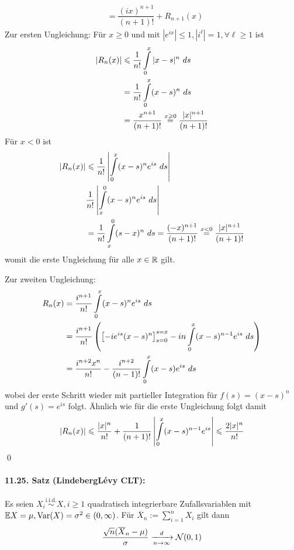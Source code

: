 \begin{enumerate}
\begin{align*}
         &=\dfrac{(ix)^{n+1}}{(n+1)!}+R_{n+1}(x)
     \end{align*}
     Zur ersten Ungleichung: \newline
     F\"ur $x\geq0$ und mit $|e^{ix}|\leq1, |i^\ell|=1,\forall\ell\geq1$ ist
     \begin{align*}
         |R_n(x)|&\leq\dfrac{1}{n!}\int\displaylimits_0^x|x-s|^n\ ds\\
         &=\dfrac{1}{n!}\int\displaylimits_0^x(x-s)^n\ ds \\
         &=\dfrac{x^{n+1}}{(n+1)!}\overset{x\geq0}{=}\dfrac{|x|^{n+1}}{(n+1)!}
     \end{align*}
     F\"ur $x<0$ ist
     \begin{align*}
         |R_n(x)|&\leq\dfrac{1}{n!}\left|\int\displaylimits_0^x(x-s)^ne^{is}\ ds\right|\\
         &\dfrac{1}{n!}\left|\int\displaylimits_x^0(x-s)^ne^{is}\ ds\right| \\
         &=\dfrac{1}{n!}\int\displaylimits_x^0(s-x)^n\ ds =\dfrac{(-x)^{n+1}}{(n+1)!}\overset{x<0}{=}\dfrac{|x|^{n+1}}{(n+1)!}
     \end{align*}
     womit die erste Ungleichung f\"ur alle $x\in\R$ gilt.
 \end{enumerate}
 Zur zweiten Ungleichung:\newline
 \begin{align*}
     R_n(x)&=\dfrac{i^{n+1}}{n!}\int\displaylimits_0^x(x-s)^ne^{is}\ ds\\
     &=\dfrac{i^{n+1}}{n!}\left(\left[-ie^{is}(x-s)^n\right]_{s=0}^{s=x}-in\int\displaylimits_0^x(x-s)^{n-1}e^{is}\ ds\right) \\
     &=\dfrac{i^{n+2}x^n}{n!}-\dfrac{i^{n+2}}{(n-1)!}\int\displaylimits_0^x(x-s)e^{is}\ ds
 \end{align*}
 wobei der erste Schritt wieder mit partieller Integration f\"ur $f(s)=(x-s)^n$ und $g'(s)=e^{is}$ folgt. \"Ahnlich wie f\"ur die erste Ungleichung folgt damit
 $$|R_n(x)|\leq\dfrac{|x|^n}{n!}+\dfrac{1}{(n+1)!}\left|\int\displaylimits_0^x(x-s)^{n-1}e^{is}\right|\leq\dfrac{2|x|^n}{n!}$$
 \qed
 
 \paragraph{11.25. Satz (Lindeberg\textendash L\'evy CLT):} Es seien $X_i\overset{\text{i.i.d.}}{\sim} X,i\geq1$ quadratisch integrierbare Zufallsvariablen mit $\E X=\mu,\operatorname{Var}(X)=\sigma^2\in(0,\infty)$. F\"ur $\overline X_n:=\sum_{i=1}^n X_i$ gilt dann
 $$\dfrac{\sqrt{n}(\overline X_n-\mu)}{\sigma}\nto{d}{n\to\infty}\mathcal{N}(0,1)$$
 
